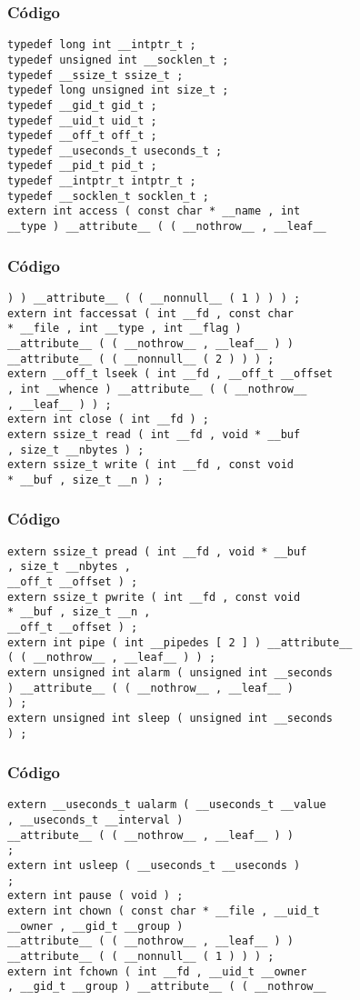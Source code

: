 \documentclass{beamer}
\begin{document}
\begin{frame}[fragile]
\frametitle{C\'odigo}
\begin{verbatim}
typedef long int __intptr_t ; 
typedef unsigned int __socklen_t ; 
typedef __ssize_t ssize_t ; 
typedef long unsigned int size_t ; 
typedef __gid_t gid_t ; 
typedef __uid_t uid_t ; 
typedef __off_t off_t ; 
typedef __useconds_t useconds_t ; 
typedef __pid_t pid_t ; 
typedef __intptr_t intptr_t ; 
typedef __socklen_t socklen_t ; 
extern int access ( const char * __name , int 
__type ) __attribute__ ( ( __nothrow__ , __leaf__ 
\end{verbatim}
\end{frame}
\begin{frame}[fragile]
\frametitle{C\'odigo}
\begin{verbatim}
) ) __attribute__ ( ( __nonnull__ ( 1 ) ) ) ; 
extern int faccessat ( int __fd , const char 
* __file , int __type , int __flag ) 
__attribute__ ( ( __nothrow__ , __leaf__ ) ) 
__attribute__ ( ( __nonnull__ ( 2 ) ) ) ; 
extern __off_t lseek ( int __fd , __off_t __offset 
, int __whence ) __attribute__ ( ( __nothrow__ 
, __leaf__ ) ) ; 
extern int close ( int __fd ) ; 
extern ssize_t read ( int __fd , void * __buf 
, size_t __nbytes ) ; 
extern ssize_t write ( int __fd , const void 
* __buf , size_t __n ) ; 
\end{verbatim}
\end{frame}
\begin{frame}[fragile]
\frametitle{C\'odigo}
\begin{verbatim}
extern ssize_t pread ( int __fd , void * __buf 
, size_t __nbytes , 
__off_t __offset ) ; 
extern ssize_t pwrite ( int __fd , const void 
* __buf , size_t __n , 
__off_t __offset ) ; 
extern int pipe ( int __pipedes [ 2 ] ) __attribute__ 
( ( __nothrow__ , __leaf__ ) ) ; 
extern unsigned int alarm ( unsigned int __seconds 
) __attribute__ ( ( __nothrow__ , __leaf__ ) 
) ; 
extern unsigned int sleep ( unsigned int __seconds 
) ; 
\end{verbatim}
\end{frame}
\begin{frame}[fragile]
\frametitle{C\'odigo}
\begin{verbatim}
extern __useconds_t ualarm ( __useconds_t __value 
, __useconds_t __interval ) 
__attribute__ ( ( __nothrow__ , __leaf__ ) ) 
; 
extern int usleep ( __useconds_t __useconds ) 
; 
extern int pause ( void ) ; 
extern int chown ( const char * __file , __uid_t 
__owner , __gid_t __group ) 
__attribute__ ( ( __nothrow__ , __leaf__ ) ) 
__attribute__ ( ( __nonnull__ ( 1 ) ) ) ; 
extern int fchown ( int __fd , __uid_t __owner 
, __gid_t __group ) __attribute__ ( ( __nothrow__ 
\end{verbatim}
\end{frame}
\end{document}
